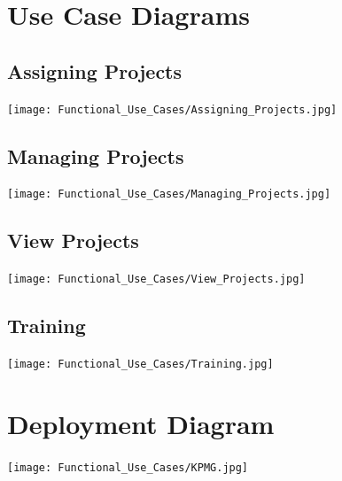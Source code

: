 \documentclass[a4paper,12pt]{article}
\begin{document}
\section{Use Case Diagrams}
	\subsection{Assigning Projects}
	\centering
	\texttt{[image: Functional\_Use\_Cases/Assigning\_Projects.jpg]}
	\subsection{Managing Projects}
	\texttt{[image: Functional\_Use\_Cases/Managing\_Projects.jpg]}
	\subsection{View Projects}
	\texttt{[image: Functional\_Use\_Cases/View\_Projects.jpg]}
	\subsection{Training}
	\texttt{[image: Functional\_Use\_Cases/Training.jpg]}
	
\section{Deployment Diagram}
\texttt{[image: Functional\_Use\_Cases/KPMG.jpg]}

\newpage
\end{document}
